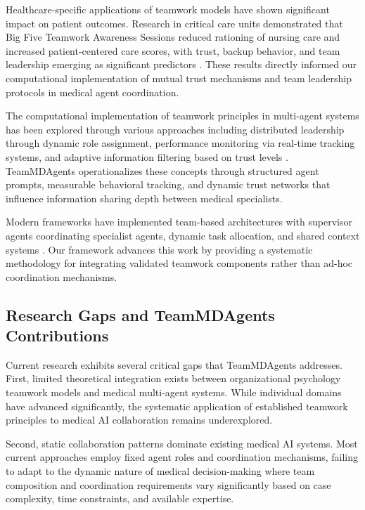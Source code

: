 \documentclass[letterpaper]{article} %
\begin{document}
Healthcare-specific applications of teamwork models have shown significant impact on patient outcomes. Research in critical care units demonstrated that Big Five Teamwork Awareness Sessions reduced rationing of nursing care and increased patient-centered care scores, with trust, backup behavior, and team leadership emerging as significant predictors \cite{hassan2025awareness}. These results directly informed our computational implementation of mutual trust mechanisms and team leadership protocols in medical agent coordination.

The computational implementation of teamwork principles in multi-agent systems has been explored through various approaches including distributed leadership through dynamic role assignment, performance monitoring via real-time tracking systems, and adaptive information filtering based on trust levels \cite{stone1997distributed}. TeamMDAgents operationalizes these concepts through structured agent prompts, measurable behavioral tracking, and dynamic trust networks that influence information sharing depth between medical specialists.

Modern frameworks have implemented team-based architectures with supervisor agents coordinating specialist agents, dynamic task allocation, and shared context systems \cite{foerster2018counterfactual}. Our framework advances this work by providing a systematic methodology for integrating validated teamwork components rather than ad-hoc coordination mechanisms.

\subsection{Research Gaps and TeamMDAgents Contributions}

Current research exhibits several critical gaps that TeamMDAgents addresses. First, limited theoretical integration exists between organizational psychology teamwork models and medical multi-agent systems. While individual domains have advanced significantly, the systematic application of established teamwork principles to medical AI collaboration remains underexplored.

Second, static collaboration patterns dominate existing medical AI systems. Most current approaches employ fixed agent roles and coordination mechanisms, failing to adapt to the dynamic nature of medical decision-making where team composition and coordination requirements vary significantly based on case complexity, time constraints, and available expertise.
\end{document}
